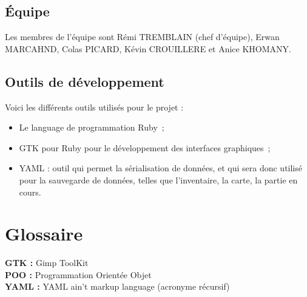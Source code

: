 \documentclass[11pt]{article}
\begin{document}
\subsection{Équipe}

Les membres de l'équipe sont Rémi TREMBLAIN (chef d'équipe), Erwan MARCAHND, Colas PICARD, Kévin CROUILLERE et Anice KHOMANY.





\subsection{Outils de développement}

Voici les différents outils utilisés pour le projet :

\begin{itemize}
   \item Le language de programmation Ruby~;
   \item GTK pour Ruby pour le développement des interfaces graphiques~;
   \item YAML : outil qui permet la sérialisation de données, et qui sera donc utilisé pour la sauvegarde de données, telles que l'inventaire, la carte, la partie en cours.
\end{itemize}



\section{Glossaire}

\textbf{GTK : }Gimp ToolKit\\
\textbf{POO : }Programmation Orientée Objet\\
\textbf{YAML : }YAML ain't markup language (acronyme récursif)\\


\renewcommand{\thefootnote}{\*} %
\end{document}
